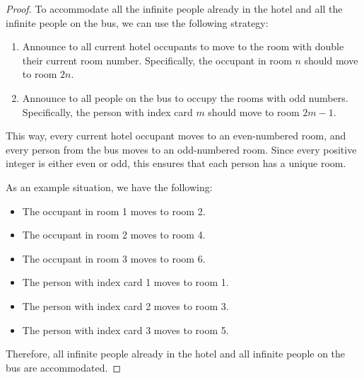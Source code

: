 \documentclass{article}
\begin{document}
\begin{enumerate}
          \begin{proof}
              To accommodate all the infinite people already in the hotel and all the infinite people on the bus, we can use the following strategy:
              \begin{enumerate}[label=\arabic*.]
                  \item Announce to all current hotel occupants to move to the room with double their
                        current room number. Specifically, the occupant in room $n$ should move to room
                        $2n$.
                  \item Announce to all people on the bus to occupy the rooms with odd numbers.
                        Specifically, the person with index card $m$ should move to room $2m-1$.
              \end{enumerate}
              This way, every current hotel occupant moves to an even-numbered room, and every person from the bus moves to an odd-numbered room. Since every positive integer is either even or odd, this ensures that each person has a unique room.

              As an example situation, we have the following:
              \begin{itemize}
                  \item The occupant in room 1 moves to room 2.
                  \item The occupant in room 2 moves to room 4.
                  \item The occupant in room 3 moves to room 6.
                  \item The person with index card 1 moves to room 1.
                  \item The person with index card 2 moves to room 3.
                  \item The person with index card 3 moves to room 5.
              \end{itemize}
              Therefore, all infinite people already in the hotel and all infinite people on the bus are accommodated.
          \end{proof}

\end{enumerate}
\end{document}
